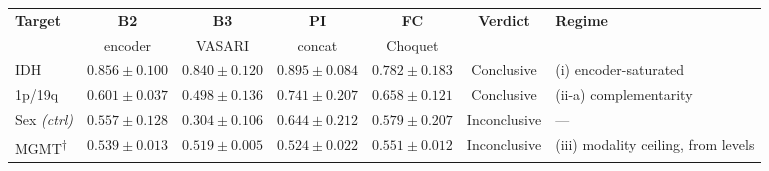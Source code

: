 \footnotesize
\setlength{\tabcolsep}{5pt}
\renewcommand{\arraystretch}{1.2}
\begin{tabular}{l cccc c l}
\toprule
\textbf{Target} & \textbf{B2} & \textbf{B3} & \textbf{PI} & \textbf{FC} &
  \textbf{Verdict} & \textbf{Regime} \\
 & {\scriptsize encoder} & {\scriptsize VASARI} & {\scriptsize concat} &
   {\scriptsize Choquet} & & \\
\midrule
IDH            & $0.856{\pm}0.100$ & $0.840{\pm}0.120$ &
  $\mathbf{0.895}{\pm}0.084$ & $0.782{\pm}0.183$ & Conclusive &
  (i) encoder-saturated \\
1p/19q         & $0.601{\pm}0.037$ & $0.498{\pm}0.136$ &
  $\mathbf{0.741}{\pm}0.207$ & $0.658{\pm}0.121$ & Conclusive &
  (ii-a) complementarity \\
Sex \emph{(ctrl)} & $0.557{\pm}0.128$ & $0.304{\pm}0.106$ &
  $0.644{\pm}0.212$ & $0.579{\pm}0.207$ & Inconclusive & --- \\
\midrule
MGMT\textsuperscript{$\dagger$} & $0.539{\pm}0.013$ & $0.519{\pm}0.005$ &
  $0.524{\pm}0.022$ & $0.551{\pm}0.012$ & Inconclusive &
  (iii) modality ceiling, from levels \\
\bottomrule
\end{tabular}

